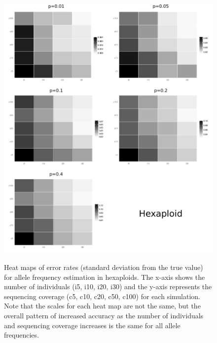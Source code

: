 \documentclass[11pt,english,letterpaper,oneside]{article}
\begin{document}
\begin{figure}
\centering
\caption{Heat maps of error rates (standard deviation from the true value) for allele frequency estimation in hexaploids. The x-axis shows the number of individuals (i5, i10, i20, i30) and the y-axis represents the sequencing coverage (c5, c10, c20, c50, c100) for each simulation. Note that the scales for each heat map  are not the same, but the overall pattern of increased accuracy as the number of individuals and sequencing coverage increases is the same for all allele frequencies.}
\vspace{0.25in}
\includegraphics{fig/figure3-hex-heatmaps}
\label{fig:hex-heatmaps}
\end{figure}
\end{document}
